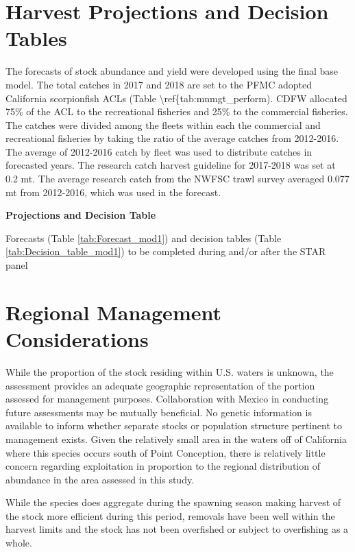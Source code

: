 \documentclass[12pt,]{article}
\begin{document}
\section{Harvest Projections and Decision
Tables}\label{harvest-projections-and-decision-tables}

The forecasts of stock abundance and yield were developed using the
final base model. The total catches in 2017 and 2018 are set to the PFMC
adopted California scorpionfish ACLs (Table
\textbackslash{}ref\{tab:mnmgt\_perform). CDFW allocated 75\% of the ACL
to the recreational fisheries and 25\% to the commercial fisheries. The
catches were divided among the fleets within each the commercial and
recreational fisheries by taking the ratio of the average catches from
2012-2016. The average of 2012-2016 catch by fleet was used to
distribute catches in forecasted years. The research catch harvest
guideline for 2017-2018 was set at 0.2 mt. The average research catch
from the NWFSC trawl survey averaged 0.077 mt from 2012-2016, which was
used in the forecast.

\textbf{Projections and Decision Table}

Forecasts (Table \ref{tab:Forecast_mod1}) and decision tables (Table
\ref{tab:Decision_table_mod1}) to be completed during and/or after the
STAR panel

\section{Regional Management
Considerations}\label{regional-management-considerations}

While the proportion of the stock residing within U.S. waters is
unknown, the assessment provides an adequate geographic representation
of the portion assessed for management purposes. Collaboration with
Mexico in conducting future assessments may be mutually beneficial. No
genetic information is available to inform whether separate stocks or
population structure pertinent to management exists. Given the
relatively small area in the waters off of California where this species
occurs south of Point Conception, there is relatively little concern
regarding exploitation in proportion to the regional distribution of
abundance in the area assessed in this study.

While the species does aggregate during the spawning season making
harvest of the stock more efficient during this period, removals have
been well within the harvest limits and the stock has not been
overfished or subject to overfishing as a whole.
\end{document}
